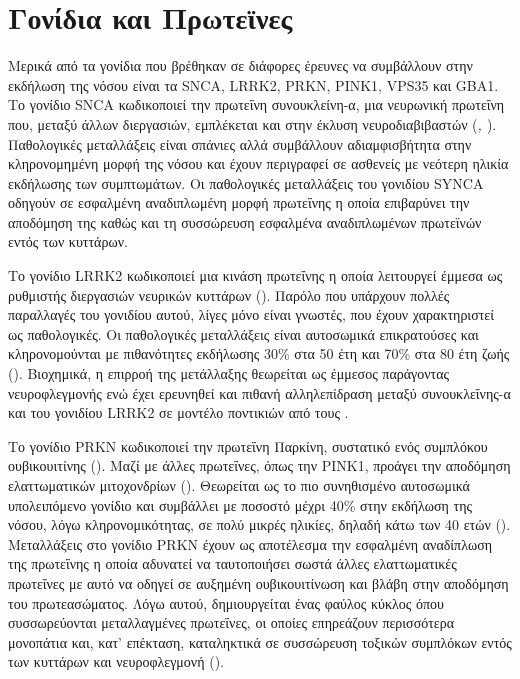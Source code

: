 \documentclass[12pt]{report}
\begin{document}
        \section{Γονίδια και Πρωτεϊνες}
        Μερικά από τα γονίδια που βρέθηκαν σε διάφορες έρευνες να συμβάλλουν στην εκδήλωση της νόσου είναι τα SNCA, LRRK2, PRKN, PINK1, VPS35 και GBA1. Το γονίδιο SNCA κωδικοποιεί την πρωτεΐνη συνουκλείνη-α, μια νευρωνική πρωτεΐνη που, μεταξύ άλλων διεργασιών, εμπλέκεται και στην έκλυση νευροδιαβιβαστών (\emph{\cite{Trevisan2024GeneticsPerspectives}, \cite{Jankovic2020ParkinsonsTreatment}}). Παθολογικές μεταλλάξεις είναι σπάνιες αλλά συμβάλλουν αδιαμφισβήτητα στην κληρονομημένη μορφή της νόσου και έχουν περιγραφεί σε ασθενείς με νεότερη ηλικία εκδήλωσης των συμπτωμάτων. Οι παθολογικές μεταλλάξεις του γονιδίου SYNCA οδηγούν σε εσφαλμένη αναδιπλωμένη μορφή πρωτεΐνης η οποία επιβαρύνει την αποδόμηση της καθώς και τη συσσώρευση εσφαλμένα αναδιπλωμένων πρωτεϊνών εντός των κυττάρων.
        \par
        Το γονίδιο LRRK2  κωδικοποιεί μια κινάση πρωτεΐνης η οποία λειτουργεί έμμεσα ως ρυθμιστής διεργασιών νευρικών κυττάρων (\emph{\cite{Trevisan2024GeneticsPerspectives}}). Παρόλο που υπάρχουν πολλές παραλλαγές του γονιδίου αυτού, λίγες μόνο είναι γνωστές, που έχουν χαρακτηριστεί ως παθολογικές. Οι παθολογικές μεταλλάξεις είναι αυτοσωμικά επικρατούσες και κληρονομούνται με πιθανότητες εκδήλωσης 30\% στα 50 έτη και 70\% στα 80 έτη ζωής (\emph{\cite{Healy2008PhenotypeStudy}}). Βιοχημικά, η επιρροή της μετάλλαξης θεωρείται ως έμμεσος παράγοντας νευροφλεγμονής ενώ έχει ερευνηθεί και πιθανή αλληλεπίδραση μεταξύ συνουκλεΐνης-α και του γονιδίου LRRK2 σε μοντέλο ποντικιών από τους \cite{Bieri2019LRRK2Neurons}.
        \par
        Το γονίδιο PRKN κωδικοποιεί την πρωτεΐνη Παρκίνη, συστατικό ενός συμπλόκου ουβικουιτίνης (\emph{\cite{Trevisan2024GeneticsPerspectives}}). Μαζί με άλλες πρωτεΐνες, όπως την PINK1, προάγει την αποδόμηση ελαττωματικών μιτοχονδρίων (\emph{\cite{Yoshino2022Genotype-phenotypeVariants}}). Θεωρείται ως το πιο συνηθισμένο αυτοσωμικά υπολειπόμενο γονίδιο και συμβάλλει με ποσοστό μέχρι 40\% στην εκδήλωση της νόσου, λόγω κληρονομικότητας, σε πολύ μικρές ηλικίες, δηλαδή κάτω των 40 ετών (\emph{\cite{Wasner2022ParkinInflammation}}). Μεταλλάξεις στο γονίδιο PRKN έχουν ως αποτέλεσμα την εσφαλμένη αναδίπλωση της πρωτεΐνης η οποία αδυνατεί να ταυτοποιήσει σωστά άλλες ελαττωματικές πρωτεΐνες με αυτό να οδηγεί σε αυξημένη ουβικουιτίνωση και βλάβη στην αποδόμηση του πρωτεασώματος. Λόγω αυτού, δημιουργείται ένας φαύλος κύκλος όπου συσσωρεύονται μεταλλαγμένες πρωτεΐνες, οι οποίες επηρεάζουν περισσότερα μονοπάτια και, κατ' επέκταση, καταληκτικά σε συσσώρευση τοξικών συμπλόκων εντός των κυττάρων και νευροφλεγμονή (\emph{\cite{Jankovic2020ParkinsonsTreatment}}).
\end{document}
